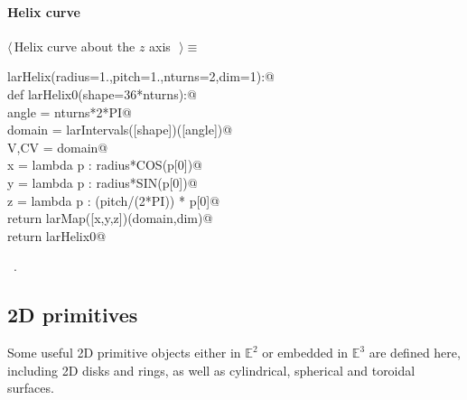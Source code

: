 \documentclass[11pt,oneside]{article}	%
\def\E{\mathbb{E}}
\begin{document}
\paragraph{Helix curve}
\begin{flushleft} \small \label{scrap7}
$\langle\,$Helix curve about the $z$ axis\nobreak\ {\footnotesize {}}$\,\rangle\equiv$
\vspace{-1ex}
\begin{list}{}{} \item
\mbox{}\verb@def larHelix(radius=1.,pitch=1.,nturns=2,dim=1):@\\
\mbox{}\verb@   def larHelix0(shape=36*nturns):@\\
\mbox{}\verb@      angle = nturns*2*PI@\\
\mbox{}\verb@      domain = larIntervals([shape])([angle])@\\
\mbox{}\verb@      V,CV = domain@\\
\mbox{}\verb@      x = lambda p : radius*COS(p[0])@\\
\mbox{}\verb@      y = lambda p : radius*SIN(p[0])@\\
\mbox{}\verb@      z = lambda p : (pitch/(2*PI)) * p[0]@\\
\mbox{}\verb@      return larMap([x,y,z])(domain,dim)@\\
\mbox{}\verb@   return larHelix0@\\
\mbox{}\verb@@{\NWsep}
\end{list}
\vspace{-1ex}
\footnotesize\addtolength{\baselineskip}{-1ex}
\begin{list}{}{\setlength{\itemsep}{-\parsep}\setlength{\itemindent}{-\leftmargin}}
\item \NWtxtMacroRefIn\ .
\end{list}
\end{flushleft}
\subsection{2D primitives}
Some useful 2D primitive objects either in $\E^2$ or embedded in $\E^3$ are defined here, including 2D disks and rings, as well as cylindrical, spherical and toroidal surfaces.
\end{document}
